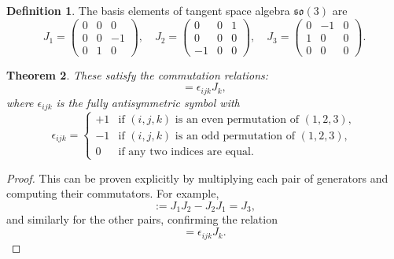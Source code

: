 \documentclass{amsart}
\newtheorem{theorem}{Theorem}[section]
\theoremstyle{definition}
\newtheorem{definition}[theorem]{Definition}
\theoremstyle{remark}
\begin{document}
\begin{definition}
  The basis elements of tangent space algebra $\mathfrak{so}(3)$ are
  \begin{equation*}
    J_1 =
    \begin{pmatrix}
      0 & 0 & 0 \\
      0 & 0 & -1 \\
      0 & 1 & 0
    \end{pmatrix}, \quad
    J_2 =
    \begin{pmatrix}
      0 & 0 & 1 \\
      0 & 0 & 0 \\
      -1 & 0 & 0
    \end{pmatrix}, \quad
    J_3 =
    \begin{pmatrix}
      0 & -1 & 0 \\
      1 & 0 & 0 \\
      0 & 0 & 0
    \end{pmatrix}.
  \end{equation*}
\end{definition}

\begin{theorem}\label{thm:so3_commutation_relations}
  These satisfy the commutation relations:
  \begin{equation*}
    [J_i, J_j] = \epsilon_{ijk} J_k,
  \end{equation*}
  where $\epsilon_{ijk}$ is the fully antisymmetric symbol with
  \begin{equation*}
    \epsilon_{ijk} =
    \begin{cases}
      +1 & \text{if } (i,j,k) \text{ is an even permutation of } (1,2,3), \\
      -1 & \text{if } (i,j,k) \text{ is an odd permutation of } (1,2,3), \\
      0 & \text{if any two indices are equal}.
    \end{cases}
  \end{equation*}
\end{theorem}
\begin{proof}
  This can be proven explicitly by multiplying each pair of generators and computing their commutators.
  For example,
  \begin{equation*}
    [J_1, J_2] := J_1 J_2 - J_2 J_1 = J_3,
  \end{equation*}
  and similarly for the other pairs, confirming the relation
  \begin{equation*}
    [J_i, J_j] = \epsilon_{ijk} J_k.
  \end{equation*}
\end{proof}
\end{document}
